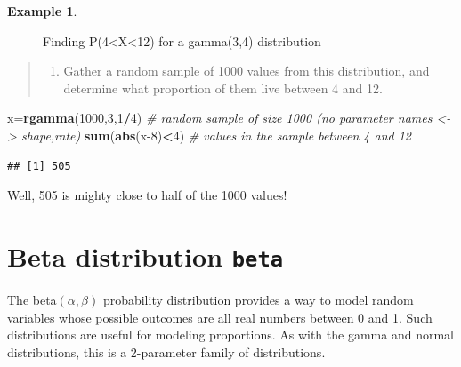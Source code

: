 \documentclass[
]{book}
\newenvironment{Shaded}{\begin{snugshade}}{\end{snugshade}}
\newcommand{\CommentTok}[1]{\textcolor[rgb]{0.56,0.35,0.01}{\textit{#1}}}
\newcommand{\DecValTok}[1]{\textcolor[rgb]{0.00,0.00,0.81}{#1}}
\newcommand{\FunctionTok}[1]{\textcolor[rgb]{0.13,0.29,0.53}{\textbf{#1}}}
\newcommand{\NormalTok}[1]{#1}
\newcommand{\OtherTok}[1]{\textcolor[rgb]{0.56,0.35,0.01}{#1}}
\newcommand{\SpecialCharTok}[1]{\textcolor[rgb]{0.81,0.36,0.00}{\textbf{#1}}}
\providecommand{\tightlist}{%
  \setlength{\itemsep}{0pt}\setlength{\parskip}{0pt}}
\theoremstyle{definition}
\theoremstyle{definition}
\newtheorem{example}{Example}[chapter]
\theoremstyle{definition}
\theoremstyle{definition}
\theoremstyle{remark}
\begin{document}
\begin{example}
\begin{figure}
\caption{Finding P(4<X<12) for a gamma(3,4) distribution}\label{fig:gamma-area}
\end{figure}

\begin{quote}
\begin{enumerate}
\def\labelenumi{\alph{enumi})}
\setcounter{enumi}{1}
\tightlist
\item
  Gather a random sample of 1000 values from this distribution, and determine what proportion of them live between 4 and 12.
\end{enumerate}
\end{quote}

\begin{Shaded}
\begin{Highlighting}[]
\NormalTok{x}\OtherTok{=}\FunctionTok{rgamma}\NormalTok{(}\DecValTok{1000}\NormalTok{,}\DecValTok{3}\NormalTok{,}\DecValTok{1}\SpecialCharTok{/}\DecValTok{4}\NormalTok{) }\CommentTok{\# random sample of size 1000 (no parameter names \textless{}{-}\textgreater{} shape,rate)}
\FunctionTok{sum}\NormalTok{(}\FunctionTok{abs}\NormalTok{(x}\DecValTok{{-}8}\NormalTok{)}\SpecialCharTok{\textless{}}\DecValTok{4}\NormalTok{) }\CommentTok{\# values in the sample between 4 and 12}
\end{Highlighting}
\end{Shaded}

\begin{verbatim}
## [1] 505
\end{verbatim}

Well, 505 is mighty close to half of the 1000 values!
\end{example}

\section{\texorpdfstring{Beta distribution \texttt{beta}}{Beta distribution beta}}\label{betaR}

The beta\((\alpha,\beta)\) probability distribution provides a way to model random variables whose possible outcomes are all real numbers between 0 and 1. Such distributions are useful for modeling proportions. As with the gamma and normal distributions, this is a 2-parameter family of distributions.
\end{document}
